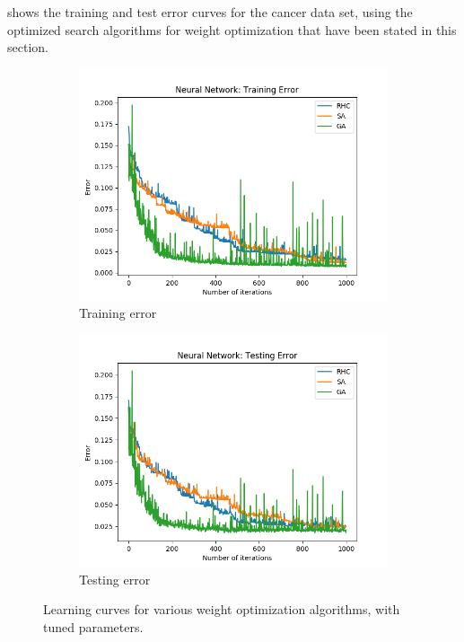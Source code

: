 \documentclass{article}
\begin{document}
       shows the training and test error curves for the cancer data set, using the optimized search algorithms for weight optimization that have been stated in this section.

      \begin{figure}[htb]
      \centering

      \begin{subfigure}{0.5\textwidth}
        \includegraphics[width=\linewidth]{out/nn-combined-training.png}
        \caption{Training error}
        \label{fig:nn-compare-1}
      \end{subfigure}\hfil
      \begin{subfigure}{0.5\textwidth}
        \includegraphics[width=\linewidth]{out/nn-combined-testing.png}
        \caption{Testing error}
        \label{fig:nn-compare-2}
      \end{subfigure}

      \caption{Learning curves for various weight optimization algorithms, with tuned parameters.}
      \label{fig:nn-compare}
      \end{figure}
\end{document}
